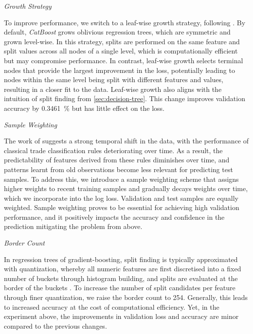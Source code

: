 \emph{Growth Strategy}

To improve performance, we switch to a leaf-wise growth strategy, following \textcite[][4]{chenXGBoostScalableTree2016}. By default, \emph{CatBoost} grows oblivious regression trees, which are symmetric and grown level-wise. In this strategy, splits are performed on the same feature and split values across all nodes of a single level, which is computationally efficient but may compromise performance. In contrast, leaf-wise growth selects terminal nodes that provide the largest improvement in the loss, potentially leading to nodes within the same level being split with different features and values, resulting in a closer fit to the data. Leaf-wise growth also aligns with the intuition of split finding from \cref{sec:decision-tree}. This change improves validation accuracy by \SI{0.3461}{\percent} but has little effect on the loss.

\emph{Sample Weighting}

The work of \textcite[][36--38]{grauerOptionTradeClassification2022} suggests a strong temporal shift in the data, with the performance of classical trade classification rules deteriorating over time.  As a result, the predictability of features derived from these rules diminishes over time, and patterns learnt from old observations become less relevant for predicting test samples. To address this, we introduce a sample weighting scheme that assigns higher weights to recent training samples and gradually decays weights over time, which we incorporate into the log loss. Validation and test samples are equally weighted. Sample weighting proves to be essential for achieving high validation performance, and it positively impacts the accuracy and confidence in the prediction mitigating the problem from above.

\emph{Border Count}

In regression trees of gradient-boosting, split finding is typically approximated with quantization, whereby all numeric features are first discretised into a fixed number of buckets through histogram building, and splits are evaluated at the border of the buckets \autocites[][4]{dorogushCatBoostGradientBoosting}[][2]{keLightGBMHighlyEfficient2017}. To increase the number of split candidates per feature through finer quantization, we raise the border count to \num{254}. Generally, this leads to increased accuracy at the cost of computational efficiency. Yet, in the experiment above, the improvements in validation loss and accuracy are minor compared to the previous changes.


